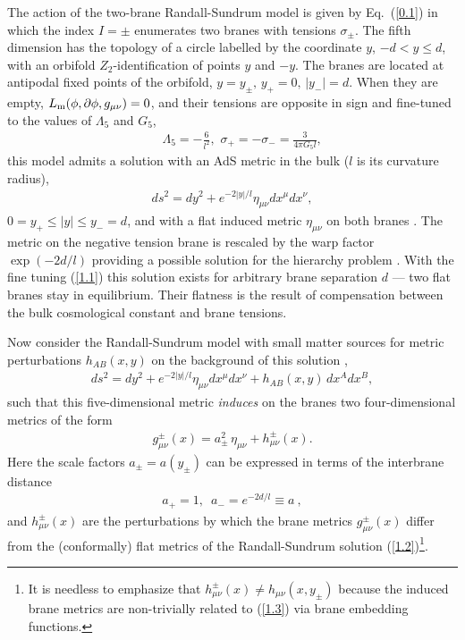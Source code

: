 \documentclass[a4paper,preprint,nofootinbib,
                 showpacs,preprintnumbers,amsmath,amssymb]{revtex4}
\begin{document}
The action of 
the two-brane Randall-Sundrum model \cite{RS} is given by 
Eq.~(\ref{0.1}) in which the index $I=\pm$ enumerates two branes 
with tensions $\sigma_\pm$. The fifth dimension has the topology 
of a circle labelled by the coordinate $y$, $-d<y\leq d$, with an 
orbifold $Z_2$-identification of points $y$ and $-y$. The branes 
are located at antipodal fixed points of the orbifold, 
$y=y_\pm,\,y_+=0,\,|y_-|=d$. When they are empty, $L_{\rm 
m}(\phi,\partial\phi,g_{\mu\nu})=0$, and their tensions are 
opposite in sign and fine-tuned to the values of $\Lambda_5$ and 
$G_5$, 
     \begin{eqnarray} 
     &&\Lambda_5=-\frac6{l^2},\,\, 
     \sigma_+=-\sigma_-=\frac3{4\pi G_5l},   \label{1.1} 
     \end{eqnarray} 
this model admits a solution with an AdS metric in the 
bulk ($l$ is its curvature radius), 
     \begin{eqnarray} 
     ds^2=dy^2+e^{-2|y|/l}\eta_{\mu\nu}dx^\mu dx^\nu,  \label{1.2} 
     \end{eqnarray} 
$0=y_+\leq|y|\leq y_-=d$, and with a flat induced metric 
$\eta_{\mu\nu}$ on both branes \cite{RS}. The metric on the 
negative tension brane is rescaled by the 
warp factor $\exp(-2d/l)$ providing a possible 
solution for the hierarchy problem \cite{RS}. With the fine tuning 
(\ref{1.1}) this solution exists for arbitrary brane separation 
$d$ --- two flat branes stay in equilibrium. Their flatness is the 
result of compensation between the bulk cosmological constant and 
brane tensions. 
 
Now consider the Randall-Sundrum model with small matter sources 
for metric perturbations $h_{AB}(x,y)$ on the background of this 
solution \cite{RSloc,GT,GKR,ChGR}, 
     \begin{eqnarray} 
     ds^2=dy^2+e^{-2|y|/l}\eta_{\mu\nu}dx^\mu dx^\nu 
     +h_{AB}(x,y)\,dx^Adx^B,                               \label{1.3} 
     \end{eqnarray} 
such that this five-dimensional metric {\em induces} on the branes two 
four-dimensional metrics of the form 
    \begin{eqnarray} 
    g^\pm_{\mu\nu}(x)= 
    a^2_\pm\,\eta_{\mu\nu}+h^\pm_{\mu\nu}(x).  \label{1.4} 
    \end{eqnarray} 
Here the scale factors $a_\pm=a(y_\pm)$ can be expressed in terms of the 
interbrane distance 
    \begin{eqnarray} 
    a_+=1,\,\,\,a_-=e^{-2d/l}\equiv a\ ,       \label{1.5} 
    \end{eqnarray} 
and $h^\pm_{\mu\nu}(x)$ are the perturbations by which the brane 
metrics $g^\pm_{\mu\nu}(x)$ differ from the (conformally) flat 
metrics of the Randall-Sundrum solution (\ref{1.2})\footnote{It is 
needless to emphasize that $h^\pm_{\mu\nu}(x)\neq 
h_{\mu\nu}(x,y_\pm)$ because the induced brane metrics are 
non-trivially related to (\ref{1.3}) via brane embedding 
functions.}. 
 
\end{document}
